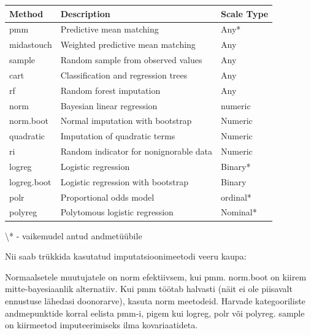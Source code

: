 \documentclass[]{book}
\newenvironment{Shaded}{\begin{snugshade}}{\end{snugshade}}
\newcommand{\KeywordTok}[1]{\textcolor[rgb]{0.13,0.29,0.53}{\textbf{#1}}}
\newcommand{\DataTypeTok}[1]{\textcolor[rgb]{0.13,0.29,0.53}{#1}}
\newcommand{\DecValTok}[1]{\textcolor[rgb]{0.00,0.00,0.81}{#1}}
\newcommand{\StringTok}[1]{\textcolor[rgb]{0.31,0.60,0.02}{#1}}
\newcommand{\CommentTok}[1]{\textcolor[rgb]{0.56,0.35,0.01}{\textit{#1}}}
\newcommand{\OperatorTok}[1]{\textcolor[rgb]{0.81,0.36,0.00}{\textbf{#1}}}
\newcommand{\NormalTok}[1]{#1}
\begin{document}
\begin{tabular}{l|l|l}
\hline
Method & Description & Scale Type\\
\hline
pmm & Predictive mean matching & Any*\\
\hline
midastouch & Weighted predictive mean matching & Any\\
\hline
sample & Random sample from observed values & Any\\
\hline
cart & Classification and regression trees & Any\\
\hline
rf & Random forest imputation & Any\\
\hline
norm & Bayesian linear regression & numeric\\
\hline
norm.boot & Normal imputation with bootstrap & Numeric\\
\hline
quadratic & Imputation of quadratic terms & Numeric\\
\hline
ri & Random indicator for nonignorable data & Numeric\\
\hline
logreg & Logistic regression & Binary*\\
\hline
logreg.boot & Logistic regression with bootstrap & Binary\\
\hline
polr & Proportional odds model & ordinal*\\
\hline
polyreg & Polytomous logistic regression & Nominal*\\
\hline
\end{tabular}

\textbackslash{}* - vaikemudel antud andmetüübile

Nii saab trükkida kasutatud imputatsioonimeetodi veeru kaupa:

\begin{Shaded}
\end{Shaded}

Normaalsetele muutujatele on norm efektiivsem, kui pmm. norm.boot on
kiirem mitte-bayesiaanlik alternatiiv. Kui pmm töötab halvasti (näit ei
ole piisavalt ennustuse lähedasi doonorarve), kasuta norm meetodeid.
Harvade kategooriliste andmepunktide korral eelista pmm-i, pigem kui
logreg, polr või polyreg. sample on kiirmeetod imputeerimiseks ilma
kovariaatideta.
\end{document}
